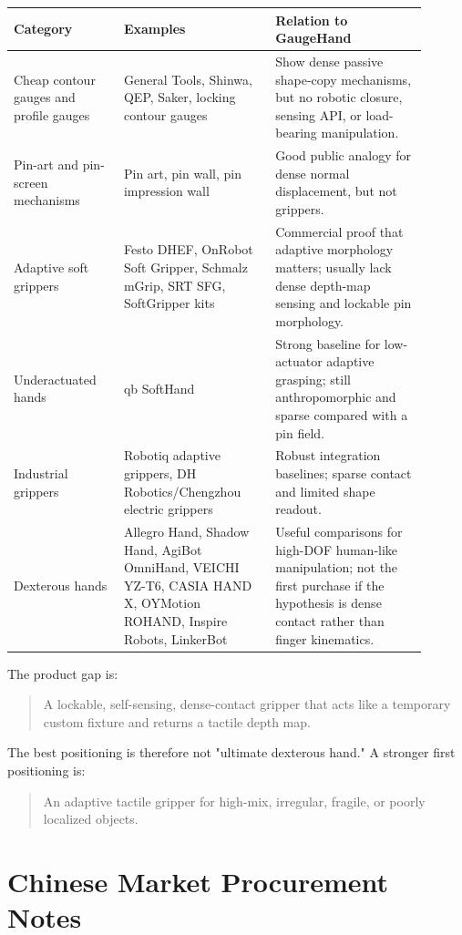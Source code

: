\documentclass[11pt]{article}
\newcommand{\GaugeHand}{GaugeHand}
\begin{document}
\begin{longtable}{L{0.24\linewidth} L{0.33\linewidth} L{0.33\linewidth}}
\toprule
\textbf{Category} & \textbf{Examples} & \textbf{Relation to \GaugeHand{}} \\
\midrule
\endhead
Cheap contour gauges and profile gauges & General Tools, Shinwa, QEP, Saker, locking contour gauges & Show dense passive shape-copy mechanisms, but no robotic closure, sensing API, or load-bearing manipulation. \\
Pin-art and pin-screen mechanisms & Pin art, pin wall, pin impression wall & Good public analogy for dense normal displacement, but not grippers. \\
Adaptive soft grippers & Festo DHEF, OnRobot Soft Gripper, Schmalz mGrip, SRT SFG, SoftGripper kits & Commercial proof that adaptive morphology matters; usually lack dense depth-map sensing and lockable pin morphology. \\
Underactuated hands & qb SoftHand & Strong baseline for low-actuator adaptive grasping; still anthropomorphic and sparse compared with a pin field. \\
Industrial grippers & Robotiq adaptive grippers, DH Robotics/Chengzhou electric grippers & Robust integration baselines; sparse contact and limited shape readout. \\
Dexterous hands & Allegro Hand, Shadow Hand, AgiBot OmniHand, VEICHI YZ-T6, CASIA HAND X, OYMotion ROHAND, Inspire Robots, LinkerBot & Useful comparisons for high-DOF human-like manipulation; not the first purchase if the hypothesis is dense contact rather than finger kinematics. \\
\bottomrule
\end{longtable}

The product gap is:

\begin{quote}
A lockable, self-sensing, dense-contact gripper that acts like a temporary custom fixture and returns a tactile depth map.
\end{quote}

The best positioning is therefore not "ultimate dexterous hand." A stronger first positioning is:

\begin{quote}
An adaptive tactile gripper for high-mix, irregular, fragile, or poorly localized objects.
\end{quote}

\section{Chinese Market Procurement Notes}
\end{document}
